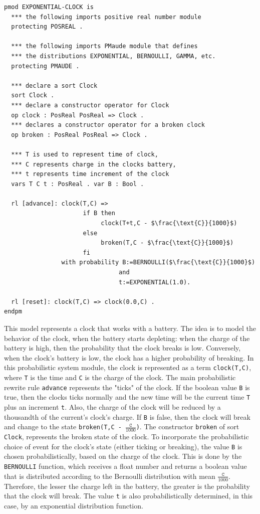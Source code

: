 \begin{lstlisting}[mathescape=true]
pmod EXPONENTIAL-CLOCK is
  *** the following imports positive real number module
  protecting POSREAL .

  *** the following imports PMaude module that defines 
  *** the distributions EXPONENTIAL, BERNOULLI, GAMMA, etc.
  protecting PMAUDE .

  *** declare a sort Clock
  sort Clock .
  *** declare a constructor operator for Clock
  op clock : PosReal PosReal => Clock .
  *** declares a constructor operator for a broken clock
  op broken : PosReal PosReal => Clock .

  *** T is used to represent time of clock,
  *** C represents charge in the clocks battery,
  *** t represents time increment of the clock
  vars T C t : PosReal . var B : Bool .
  
  rl [advance]: clock(T,C) =>
                      if B then
                           clock(T+t,C - $\frac{\text{C}}{1000}$)
                      else
                           broken(T,C - $\frac{\text{C}}{1000}$)
                      fi
                with probability B:=BERNOULLI($\frac{\text{C}}{1000}$) 
                                and 
                                t:=EXPONENTIAL(1.0).
                
  rl [reset]: clock(T,C) => clock(0.0,C) .
endpm
\end{lstlisting}
This model represents a clock that works with a battery. The idea is to model the behavior of the clock, when the battery starts depleting: when the charge of the battery is high, then the probability that the clock breaks is low. Conversely, when the clock's battery is low, the clock has a higher probability of breaking. In this probabilistic system module, the clock is represented as a term \texttt{clock(T,C)}, where \texttt{T} is the time and \texttt{C} is the charge of the clock. The main probabilistic rewrite rule \texttt{advance} represents the "ticks" of the clock. If the boolean value \texttt{B} is true, then the clocks ticks normally and the new time will be the current time \texttt{T} plus an increment \texttt{t}. Also, the charge of the clock will be reduced by a thousandth of the current's clock's charge. If \texttt{B} is false, then the clock will break and change to the state \texttt{broken(T,C - $\frac{\texttt{C}}{1000}$)}. The constructor \texttt{broken} of sort \texttt{Clock}, represents the broken state of the clock. To incorporate the probabilistic choice of event for the clock's state (either ticking or breaking), the value \texttt{B} is chosen probabilistically, based on the charge of the clock. This is done by the \texttt{BERNOULLI} function, which receives a float number and returns a boolean value that is distributed according to the Bernoulli distribution with mean $\frac{\texttt{C}}{1000}$. Therefore, the lesser the charge left in the battery, the greater is the probability that the clock will break. The value \texttt{t} is also probabilistically determined, in this case, by an exponential distribution function.
